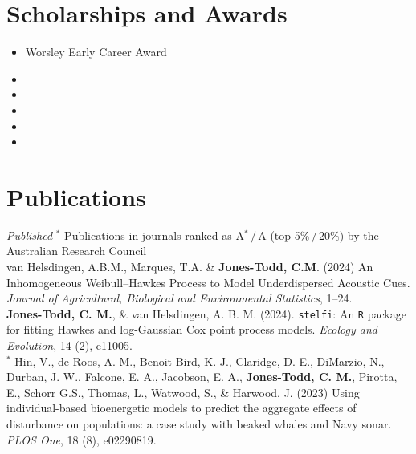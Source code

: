 \documentclass[10pt,a4paper]{moderncv}
\begin{document}
\section{Scholarships and Awards}
\vspace{2pt}
\begin{itemize}
\item { {Worsley Early Career Award}{}{}{}}
  \item {}
  \item {}
 \item {}
 \item{}
   \item{}
  \vspace{2pt}

\end{itemize}
\newpage
  \section{Publications}

  \textit{\small{Published}} {\footnotesize${}^\ast$ Publications in journals ranked as A${}^\ast\,/\,$A (top 5$\%\,/\,$20$\%$) by the Australian Research Council}\\

  van Helsdingen, A.B.M., Marques, T.A. \& \textbf{Jones-Todd, C.M}. (2024) An Inhomogeneous Weibull–Hawkes Process to Model Underdispersed Acoustic Cues. \textit{Journal of Agricultural, Biological and Environmental Statistics}, 1--24.\\

  \textbf{Jones-Todd, C. M.}, \& van Helsdingen, A. B. M. (2024). \texttt{stelfi}: An \texttt{R} package for fitting Hawkes and log-Gaussian Cox point process models. \textit{Ecology and Evolution}, 14 (2), e11005.\\

  ${}^\ast$ Hin, V., de Roos, A. M., Benoit-Bird, K. J., Claridge, D. E., DiMarzio, N.,  Durban, J. W., Falcone, E. A., Jacobson, E. A., \textbf{Jones-Todd, C. M.}, Pirotta, E., Schorr G.S., Thomas, L., Watwood, S., \& Harwood, J. (2023) Using individual-based bioenergetic models to predict the aggregate effects of disturbance on populations: a case study with beaked whales and Navy sonar. \textit{PLOS One}, 18 (8), e02290819.\\
\end{document}
